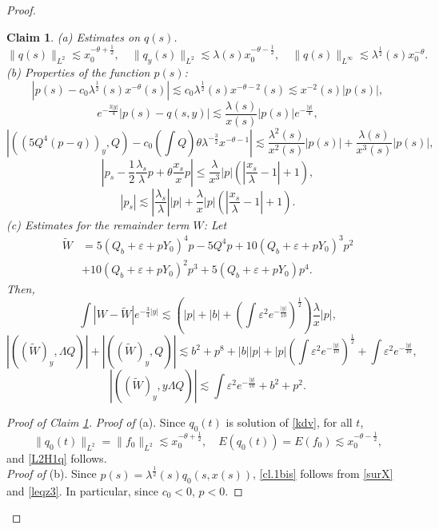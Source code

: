 \documentclass[11pt,a4paper,reqno]{amsart}
\newtheorem{claim}{Claim}
\theoremstyle{remark}
\numberwithin{equation}{section}
\newcommand{\be}{\begin{equation}}
\newcommand{\ee}{\end{equation}}
\def\e{\varepsilon}
\def\lsl{\frac{\lambda_s}{\lambda}}
\def\l{\lambda}
\def\lsl{\frac{\lambda_s}{\lambda}}
\def\xsl{\frac{x_s}{\lambda}}
\def\Yz{Y_0}
\begin{document}
\begin{proof}
\begin{claim}\label{cl:one}
{\rm (a) Estimates on $q(s)$.}
\be\label{L2H1q}
\|q(s)\|_{L^2} \lesssim x_0^{-\theta+\frac 12}, \quad
\|q_y(s)\|_{L^2}\lesssim \l(s) x_0^{-\theta-\frac 12}, \quad
\|q(s)\|_{L^\infty}\lesssim \l^{\frac 12} (s) x_0^{-\theta}.
\ee
 {\rm (b) Properties of the function $p(s)$:}
\be\label{cl.1bis}
\left|p(s) - c_0 \l^{\frac 12}(s) x^{-\theta}(s)\right| \lesssim
c_0 \l^{\frac 12}(s) x^{-\theta-2}(s)\lesssim  x^{-2}(s) |p(s)|,
\ee
\be\label{cl.2}
 e^{-\frac{3|y|}{4}} |p(s)-q(s,y)|     \lesssim \frac {\l(s)}{x(s)} |p(s)| e^{-\frac {|y|} 4} 
,
\ee
\be\label{cl.4bis}
\left| \left( (5Q^4(p-q))_y ,Q\right) - c_0 \left( \int Q\right) \theta \l^{-\frac 32} x^{-\theta-1} \right| 
\lesssim  \frac {\l^2(s)}{x^2(s)} |p(s)|+\frac {\l(s)}{x^3(s)} |p(s)|,
\ee
\be\label{cl.2bis}
\left| p_s - \frac 12   \lsl p + \theta \frac {x_s} x p \right| \leq 
\frac {\l}{x^{3}}|p|   \left(\left|\xsl - 1\right|  + 1 \right),
\ee
\be\label{cl.2tri}
|p_s| \lesssim  \left| \lsl\right| |p| + \frac {\l}{x} |p| \left(\left|\xsl - 1\right|  + 1 \right).
\ee
{\rm (c) Estimates for the remainder term $W$:} Let 
\begin{align*}
\widetilde W&=5(Q_b+ \e+p  \Yz)^4 p- 5 Q^4 p + 10(Q_b+\e+p  \Yz)^3 p^2 \\
&+ 10(Q_b+\e+p  \Yz)^2 p^3 + 5(Q_b+\e+p  \Yz) p^4.
\end{align*}
Then,
\be\label{cl.3}
\int |W-\widetilde W| e^{-\frac 34 {|y|}}  \lesssim
\left(  |p|+|b| + \left( \int \e^2 e^{-\frac {|y|}{10}} \right)^{\frac 12}\right)  \frac {\l}{x} |p| ,
\ee
\be\label{cl.4}
|((\widetilde W)_y,\Lambda Q)|+|((\widetilde W)_y,Q)|\lesssim 
 b^2 + p^8 +|b| |p|  +|p| \left(\int \e^2 e^{-\frac {|y|}{10}}\right)^{\frac 12} +\int \e^2 e^{-\frac {|y|}{10}}  ,
\ee
\be\label{cl.5}
|((\widetilde W)_y,y \Lambda Q)| \lesssim 
\int \e^2 e^{-\frac {|y|}{10}} + b^2 + p^2.
\ee
\end{claim}

\begin{proof}[Proof of Claim \ref{cl:one}]
{\it Proof of} (a). Since $q_0(t)$ is solution of \eqref{kdv}, for all $t$,
$$
\|q_0(t)\|_{L^2}= \|f_0\|_{L^2} \lesssim x_0^{-\theta+\frac 12},\quad
E(q_0(t)) = E(f_0) \lesssim x_0^{-\theta- \frac 12},
$$
and  \eqref{L2H1q} follows.\\

{\it Proof of} (b). Since $p(s) = \lambda^{\frac 12}(s) q_0(s,x(s))$, 
\eqref{cl.1bis} follows from \eqref{surX} and \eqref{leqz3}. In particular, since $c_0<0$, $p<0$.


\end{proof}
\end{proof}
\end{document}
